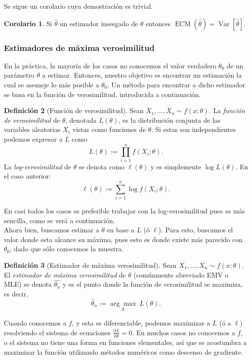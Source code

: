 \documentclass[11pt,letterpaper]{article}
\newcommand{\pderivative}[2]{\ensuremath{\frac{\mathrm{\partial}#2}{\mathrm{\partial}#1}}}
\newcommand{\variance}{\ensuremath{\operatorname{Var}}}
\newcommand{\MSE}{\ensuremath{\operatorname{ECM}}}
\theoremstyle{definition}
\newtheorem{definition}{Definición}[section]
\theoremstyle{theorem}
\newtheorem{corollary}[definition]{Corolario}
\theoremstyle{remark}
\begin{document}
	Se sigue un corolario cuya demostración es trivial.
	\begin{corollary}
		Si \(\hat{\theta}\) un estimador insesgado de \(\theta\) entonces \(\MSE(\hat{\theta})=\variance[\hat{\theta}].\)
	\end{corollary}
	\subsubsection{Estimadores de máxima verosimilitud}
	\noindent En la práctica, la mayoría de los casos no conocemos el valor verdadero \(\theta_0\) de un parámetro \(\theta\) a estimar. Entonces, nuestro objetivo es encontrar un estimación la cual se asemeje lo más posible a \(\theta_0\). Un método para encontrar a dicho estimador se basa en la función de verosimilitud, introducida a continuación.
	\begin{definition}[Función de verosimilitud]
		Sean \(X_1,\dots,X_n\sim f(x;\theta)\). La \textit{función de verosimilitud} de \(\theta\), denotada \(L(\theta)\), es la distribución conjunta de las variables aleatorias \(X_i\) vistas como funciones de \(\theta\). Si estas son independientes podemos expresar a \(L\) como \[L(\theta):=\prod_{i=1}^{n}f(X_i;\theta).\]
		La \textit{log-verosimilitud} de \(\theta\) se denota como \(\ell(\theta)\) y es simplemente \(\log L(\theta)\). En el caso anterior: \[\ell(\theta):=\sum_{i=1}^{n}\log f(X_i;\theta).\]
	\end{definition}
	En casi todos los casos es preferible trabajar con la log-verosimilitud pues es más sencilla, como se verá a continuación. \\
	Ahora bien, buscamos estimar a \(\theta\) en base a \(L\) (ó \(\ell\)). Para esto, buscamos el valor donde esta alcance su máximo, pues esto es donde existe más parecido con \(\theta_0\), dado que sólo conocemos la muestra.
	\begin{definition}[Estimador de máxima verosimilitud]
		Sean \(X_1,\dots,X_n\sim f(x;\theta)\). El \textit{estimador de máxima verosimilitud} de \(\theta\) (comúnmente abreviado EMV o MLE) se denota \(\hat{\theta_n}\) y es el punto donde la función de verosimilitud se maximiza, es decir, \[\hat{\theta}_n:=\underset{\theta}{\arg\max}\ L(\theta).\]
	\end{definition}
	Cuando conocemos a \(f\), y esta es diferenciable, podemos maximizar a \(L\) (ó a \(\ell\)) resolviendo el sistema de ecuaciones \(\pderivative{\theta}{L}=0\). En muchos casos no conocemos a \(f\), o el sistema no tiene una forma en funciones elementales, así que se acostumbra a maximizar la función utilizando métodos numéricos como descenso de gradiente. \par
\end{document}

